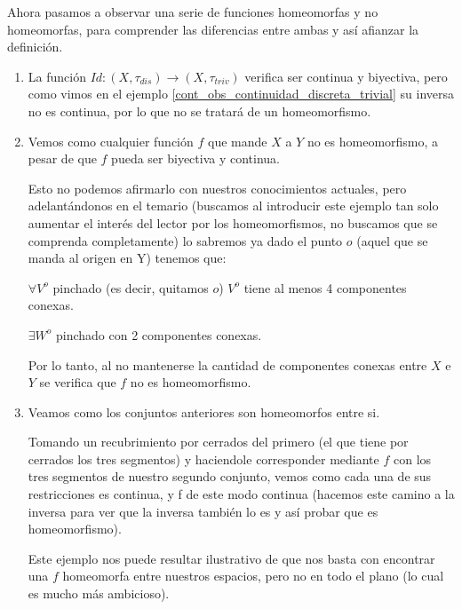 Ahora pasamos a observar una serie de funciones homeomorfas y no homeomorfas, para comprender las diferencias entre ambas y así afianzar la definición.
\label{etop_exa_homeomorfismos}
\begin{exa}[Homeomorfismos]
	
	\begin{enumerate}
		\item La función $Id\colon(X,\tau_{dis})\rightarrow(X,\tau_{triv})$ verifica ser continua y biyectiva, pero como vimos en el ejemplo \ref{cont_obs_continuidad_discreta_trivial} su inversa no es continua, por lo que no se tratará de un homeomorfismo. 
		
		\item %
		Vemos como cualquier función $f$ que mande $X$ a $Y$ no es homeomorfismo, a pesar de que $f$ pueda ser biyectiva y continua.
		
		Esto no podemos afirmarlo con nuestros conocimientos actuales, pero adelantándonos en el temario (buscamos al introducir este ejemplo tan solo aumentar el interés del lector por los homeomorfismos, no buscamos que se comprenda completamente) lo sabremos ya dado el punto $o$ (aquel que se manda al origen en Y) tenemos que:
		
		$\forall V^o$ pinchado (es decir, quitamos $o$) $V^o$ tiene al menos 4 componentes conexas.%
		
		$\exists W^o$ pinchado  con 2 componentes conexas.%
		
		Por lo tanto, al no mantenerse la cantidad de componentes conexas entre $X$ e $Y$ se verifica que $f$ no es homeomorfismo.
		
		\item %
		Veamos como los conjuntos anteriores son homeomorfos entre si.
		
		 Tomando un recubrimiento por cerrados del primero (el que tiene por cerrados los tres segmentos) y haciendole corresponder mediante $f$ con los tres segmentos de nuestro segundo conjunto, vemos como cada una de sus restricciones es continua, y f de este modo continua (hacemos este camino a la inversa para ver que la inversa también lo es y así probar que es homeomorfismo). 
		
		Este ejemplo nos puede resultar ilustrativo de que nos basta con encontrar una $f$ homeomorfa entre nuestros espacios, pero no en todo el plano (lo cual es mucho más ambicioso).
	\end{enumerate}
\end{exa}


